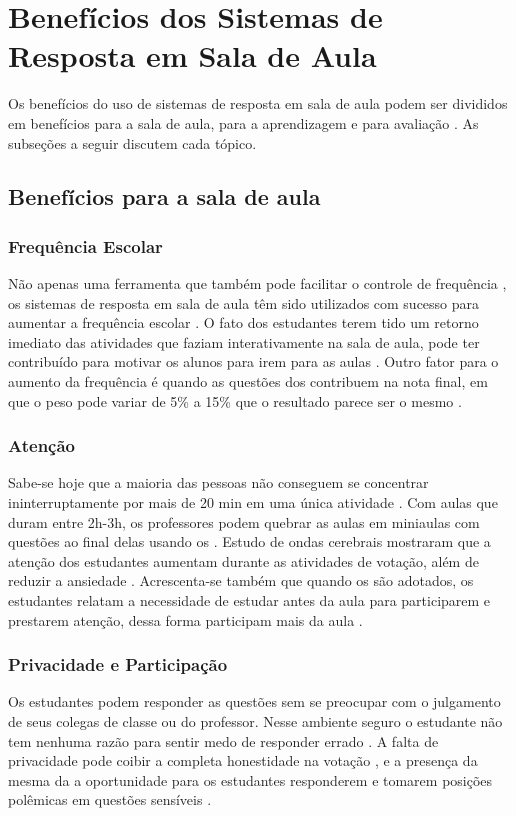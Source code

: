\section{Benefícios dos Sistemas de Resposta em Sala de Aula}
Os benefícios do uso de sistemas de resposta em sala de aula podem ser divididos
em benefícios para a sala de aula, para a aprendizagem e para avaliação \cite{Kay2009}. As
subseções a seguir discutem cada tópico.

\subsection{Benefícios para a sala de aula}

\subsubsection{Frequência Escolar}
Não apenas uma ferramenta que também pode facilitar o controle de frequência
\cite{Strasser2010},
os sistemas de resposta em sala de aula têm sido utilizados com sucesso para aumentar
a frequência escolar \cite{Fotaris2016, Puente2012, Mayer2009, Caldwell2007}. O fato dos
estudantes terem tido um retorno imediato das atividades que faziam interativamente
na sala de aula, pode ter contribuído para motivar os alunos para irem para as aulas \cite{Puente2012}.
Outro fator para o aumento da frequência é quando as questões dos {\clickers} contribuem na nota final,
em que o peso pode variar de 5\% a 15\% que o resultado parece ser o mesmo \cite{Caldwell2007}.


\subsubsection{Atenção}\label{subsubsection:attention}
Sabe-se hoje que a maioria das pessoas não conseguem se concentrar ininterruptamente
por mais de 20 min em uma única atividade \cite{Caldwell2007, DInverno2003}. Com aulas que
duram entre 2h-3h, os professores podem quebrar as aulas em miniaulas
com questões ao final delas usando os {\clickers} \cite{Hunsu2016}. Estudo de
ondas cerebrais mostraram que a atenção dos estudantes aumentam durante as
atividades de votação, além de reduzir a ansiedade \cite{Sun2014}. Acrescenta-se
também que quando os {\clickers} são adotados, os estudantes relatam a necessidade
de estudar antes da aula para participarem e prestarem atenção, dessa forma participam mais da aula \cite{Terrion2012}.

\subsubsection{Privacidade e Participação}
Os estudantes podem responder as questões sem se preocupar com o julgamento
de seus colegas de classe ou do professor. Nesse ambiente seguro o estudante
não tem nenhuma razão para sentir medo de responder errado \cite{Schmidt2011}.
 A falta de privacidade pode coibir
a completa honestidade na votação \cite{Caldwell2007}, e a presença da mesma da a oportunidade
para os estudantes responderem e tomarem posições polêmicas em questões sensíveis \cite{Rana2016}.

